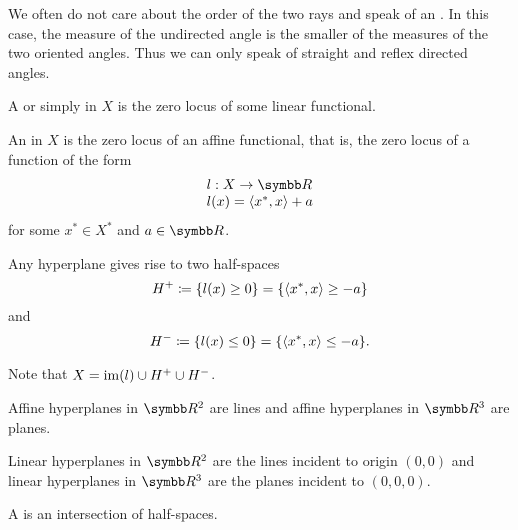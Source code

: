 \begin{definition}
  We often do not care about the order of the two rays and speak of an . In this case, the measure of the undirected angle is the smaller of the measures of the two oriented angles. Thus we can only speak of straight and reflex directed angles.
\end{definition}

\begin{definition}\label{def:hyperplane}
  A  or simply  in \( X \) is the zero locus of some linear functional.

  An  in \( X \) is the zero locus of an affine functional, that is, the zero locus of a function of the form
  \begin{equation*}
    \begin{array}{l}
      l: X \to \R \\
      l(x) = \Prod {x^*} x + a
    \end{array}
  \end{equation*}
  for some \( x^* \in X^* \) and \( a \in \R \).

  Any hyperplane gives rise to two half-spaces
  \begin{equation*}
    H^+ \coloneqq \{ l(x) \geq 0 \} = \{ \left\langle x^*, x \right\rangle \geq -a \}
  \end{equation*}
  and
  \begin{equation*}
    H^- \coloneqq \{ l(x) \leq 0 \} = \{ \left\langle x^*, x \right\rangle \leq -a \}.
  \end{equation*}

  Note that \( X = \operatorname{im}(l) \cup H^+ \cup H^- \).
\end{definition}

\begin{example}\label{ex:hyperplanes}
  Affine hyperplanes in \( \R^2 \) are lines and affine hyperplanes in \( \R^3 \) are planes.

  Linear hyperplanes in \( \R^2 \) are the lines incident to origin \( (0, 0) \) and linear hyperplanes in \( \R^3 \) are the planes incident to \( (0, 0, 0) \).
\end{example}

\begin{definition}\label{def:polyhedron}
  A  is an intersection of half-spaces.
\end{definition}

